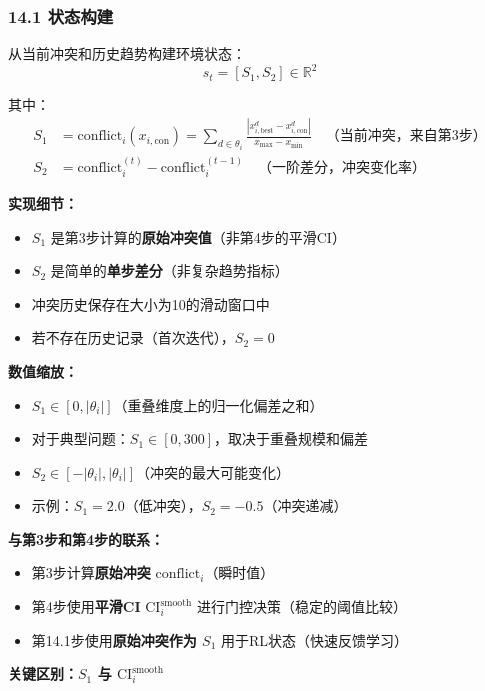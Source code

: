 \documentclass[11pt,a3paper]{ctexart}
\begin{document}
\subsubsection*{14.1 状态构建}
从当前冲突和历史趋势构建环境状态：
\begin{equation}
s_t = [S_1, S_2] \in \mathbb{R}^2
\end{equation}

其中：
\begin{align}
S_1 &= \text{conflict}_i(x_{i,\text{con}}) = \sum_{d \in \theta_i} \frac{|x_{i,\text{best}}^d - x_{i,\text{con}}^d|}{x_{\max} - x_{\min}} \quad \text{（当前冲突，来自第3步）} \\
S_2 &= \text{conflict}_i^{(t)} - \text{conflict}_i^{(t-1)} \quad \text{（一阶差分，冲突变化率）}
\end{align}

\textbf{实现细节：}
\begin{itemize}
    \item $S_1$ 是第3步计算的\textbf{原始冲突值}（非第4步的平滑CI）
    \item $S_2$ 是简单的\textbf{单步差分}（非复杂趋势指标）
    \item 冲突历史保存在大小为10的滑动窗口中
    \item 若不存在历史记录（首次迭代），$S_2 = 0$
\end{itemize}

\textbf{数值缩放：}
\begin{itemize}
    \item $S_1 \in [0, |\theta_i|]$（重叠维度上的归一化偏差之和）
    \item 对于典型问题：$S_1 \in [0, 300]$，取决于重叠规模和偏差
    \item $S_2 \in [-|\theta_i|, |\theta_i|]$（冲突的最大可能变化）
    \item 示例：$S_1 = 2.0$（低冲突），$S_2 = -0.5$（冲突递减）
\end{itemize}

\textbf{与第3步和第4步的联系：}
\begin{itemize}
    \item 第3步计算\textbf{原始冲突} $\text{conflict}_i$（瞬时值）
    \item 第4步使用\textbf{平滑CI} $\text{CI}_i^{\text{smooth}}$ 进行门控决策（稳定的阈值比较）
    \item 第14.1步使用\textbf{原始冲突作为 $S_1$} 用于RL状态（快速反馈学习）
\end{itemize}

\textbf{关键区别：$S_1$ 与 $\text{CI}_i^{\text{smooth}}$}
\end{document}
